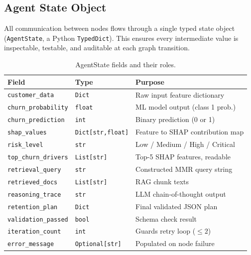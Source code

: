 \documentclass[11pt]{article}
\begin{document}
\subsection{Agent State Object}

All communication between nodes flows through a single typed state object
(\texttt{AgentState}, a Python \texttt{TypedDict}). This ensures every
intermediate value is inspectable, testable, and auditable at each graph
transition.

\begin{table}[H]
\centering
\caption{AgentState fields and their roles.}
\label{tab:state}
\renewcommand{\arraystretch}{1.5}
\begin{tabular}{L{5cm} L{3cm} L{5.5cm}}
\toprule
{}
\textbf{Field} & \textbf{Type} & \textbf{Purpose} \\
\midrule
\texttt{customer\_data}      & \texttt{Dict}            & Raw input feature dictionary \\
\texttt{churn\_probability}  & \texttt{float}           & ML model output (class 1 prob.) \\
\texttt{churn\_prediction}   & \texttt{int}             & Binary prediction (0 or 1) \\
\texttt{shap\_values}        & \texttt{Dict[str,float]} & Feature to SHAP contribution map \\
\texttt{risk\_level}         & \texttt{str}             & Low / Medium / High / Critical \\
\texttt{top\_churn\_drivers} & \texttt{List[str]}       & Top-5 SHAP features, readable \\
\texttt{retrieval\_query}    & \texttt{str}             & Constructed MMR query string \\
\texttt{retrieved\_docs}     & \texttt{List[str]}       & RAG chunk texts \\
\texttt{reasoning\_trace}    & \texttt{str}             & LLM chain-of-thought output \\
\texttt{retention\_plan}     & \texttt{Dict}            & Final validated JSON plan \\
\texttt{validation\_passed}  & \texttt{bool}            & Schema check result \\
\texttt{iteration\_count}    & \texttt{int}             & Guards retry loop ($\leq 2$) \\
\texttt{error\_message}      & \texttt{Optional[str]}   & Populated on node failure \\
\bottomrule
\end{tabular}
\end{table}
\end{document}
